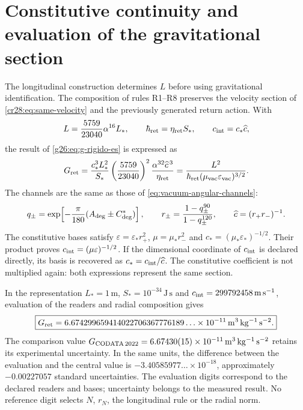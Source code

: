 \section{Constitutive continuity and evaluation of the gravitational section}
\label{cr28:sec:radial-evaluation}

The longitudinal construction determines \(L\) before using gravitational identification. The composition of rules R1--R8 preserves the velocity section of \eqref{cr28:eq:same-velocity} and the previously generated return action. With
\[
 L=\frac{5759}{23040}\alpha^{16}L_*,
 \qquad \hbar_{\rm ret}=\eta_{\rm ret}S_*,
 \qquad c_{\rm int}=c_*\widehat c,
\]
the result of \eqref{g26:eq:g-rigido-es} is expressed as
\begin{equation}
 G_{\rm ret}
 =\frac{c_*^3L_*^2}{S_*}
   \left(\frac{5759}{23040}\right)^2
   \frac{\alpha^{32}\widehat c^{\,3}}{\eta_{\rm ret}}
 =\frac{L^2}
 {\hbar_{\rm ret}(\mu_{\rm vac}\varepsilon_{\rm vac})^{3/2}}.
 \label{cr28:eq:g-constitutive-evaluation}
\end{equation}
The channels are the same as those of \eqref{eq:vacuum-angular-channels}:
\[
 q_\pm=\exp\!\left[-\frac{\pi}{180}(A_{\rm deg}\pm C^*_{\rm deg})\right],
 \qquad r_\pm=\frac{1-q_\pm^{90}}{1-q_\pm^{120}},
 \qquad \widehat c=(r_+r_-)^{-1}.
\]
The constitutive bases satisfy \(\varepsilon=\varepsilon_*r_+^2\), \(\mu=\mu_*r_-^2\) and \(c_*=(\mu_*\varepsilon_*)^{-1/2}\). Their product proves \(c_{\rm int}=(\mu\varepsilon)^{-1/2}\). If the dimensional coordinate of \(c_{\rm int}\) is declared directly, its basis is recovered as \(c_*=c_{\rm int}/\widehat c\). The constitutive coefficient is not multiplied again: both expressions represent the same section.

In the representation \(L_*=1\,\mathrm m\), \(S_*=10^{-34}\,\mathrm{J\,s}\) and \(c_{\rm int}=299792458\,\mathrm{m\,s^{-1}}\), evaluation of the readers and radial composition gives
\begin{equation}
 \boxed{
 G_{\rm ret}
 =6.674299659414022706367776189\ldots\times10^{-11}
 \,\mathrm{m^3\,kg^{-1}\,s^{-2}}.}
 \label{cr28:eq:g-evaluation}
\end{equation}
The comparison value \(G_{\rm CODATA\,2022}=6.67430(15)\times10^{-11}\,
\mathrm{m^3\,kg^{-1}\,s^{-2}}\) retains its experimental uncertainty. In the same units, the difference between the evaluation and the central value is \(-3.40585977\ldots\times10^{-18}\), approximately \(-0.00227057\) standard uncertainties. The evaluation digits correspond to the declared readers and bases; uncertainty belongs to the measured result. No reference digit selects \(N\), \(r_N\), the longitudinal rule or the radial norm.

